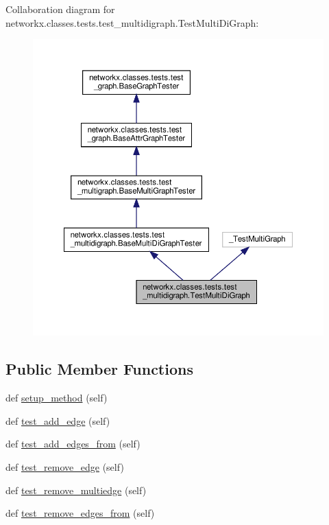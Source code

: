 Collaboration diagram for networkx.\+classes.\+tests.\+test\+\_\+multidigraph.\+Test\+Multi\+Di\+Graph\+:
\nopagebreak
\begin{figure}[H]
\begin{center}
\leavevmode
\includegraphics[width=350pt]{classnetworkx_1_1classes_1_1tests_1_1test__multidigraph_1_1TestMultiDiGraph__coll__graph}
\end{center}
\end{figure}
\subsection*{Public Member Functions}
\begin{DoxyCompactItemize}
\item 
def \hyperlink{classnetworkx_1_1classes_1_1tests_1_1test__multidigraph_1_1TestMultiDiGraph_a24e8c5ea97f9d0b7fb908a70f6d1b9d5}{setup\+\_\+method} (self)
\item 
def \hyperlink{classnetworkx_1_1classes_1_1tests_1_1test__multidigraph_1_1TestMultiDiGraph_a02cdca08b75feeae24bce20a7fd65fc5}{test\+\_\+add\+\_\+edge} (self)
\item 
def \hyperlink{classnetworkx_1_1classes_1_1tests_1_1test__multidigraph_1_1TestMultiDiGraph_ae67f050c38fc75f88f4e00911bfa504d}{test\+\_\+add\+\_\+edges\+\_\+from} (self)
\item 
def \hyperlink{classnetworkx_1_1classes_1_1tests_1_1test__multidigraph_1_1TestMultiDiGraph_a9c26b275df033965be34be8b456915c5}{test\+\_\+remove\+\_\+edge} (self)
\item 
def \hyperlink{classnetworkx_1_1classes_1_1tests_1_1test__multidigraph_1_1TestMultiDiGraph_a790f65f7236075e9431ee24befad17fe}{test\+\_\+remove\+\_\+multiedge} (self)
\item 
def \hyperlink{classnetworkx_1_1classes_1_1tests_1_1test__multidigraph_1_1TestMultiDiGraph_a353433c64eab0e6b680e0511539ad9f1}{test\+\_\+remove\+\_\+edges\+\_\+from} (self)
\end{DoxyCompactItemize}
